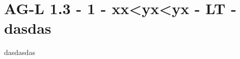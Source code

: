 \section{AG-L 1.3 - 1 - xx<yx<yx - LT - dasdas}

\begin{beispiel}[AG-L 1.3]{1}
dasdasdas
\end{beispiel}